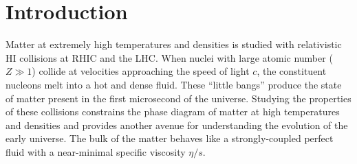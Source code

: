 \chapter{Introduction}
\label{ch:intro}



 

Matter at extremely high temperatures and densities is studied with relativistic \ac{HI} collisions at \ac{RHIC} and the \ac{LHC}.
When nuclei with large atomic number ($Z \gg 1$) collide at velocities approaching the speed of light $c$, the constituent nucleons melt into a hot and dense fluid.
These ``little bangs'' produce the state of matter present in the first microsecond of the universe.
Studying the properties of these collisions constrains the phase diagram of matter at high temperatures and densities and provides another avenue for understanding the evolution of the early universe.
The bulk of the matter behaves like a strongly-coupled perfect fluid with a near-minimal specific viscosity $\eta/s$.

